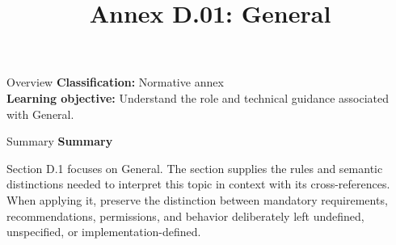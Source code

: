 \documentclass[10pt,letterpaper]{article}
\title{Annex D.01: General}
\author{}
\date{}
\begin{document}
\maketitle
\begin{CornellOverviewBox}{Overview}
\textbf{Classification:} Normative annex\\[2pt]
\textbf{Learning objective:} Understand the role and technical guidance associated with General.
\end{CornellOverviewBox}\begin{CornellSummaryBox}{Summary}
{\sffamily\bfseries\color{Accent} Summary}\par\vspace{3pt}Section D.1 focuses on General. The section supplies the rules and semantic distinctions needed to interpret this topic in context with its cross-references. When applying it, preserve the distinction between mandatory requirements, recommendations, permissions, and behavior deliberately left undefined, unspecified, or implementation-defined.
\end{CornellSummaryBox}
\end{document}
